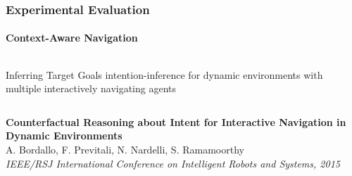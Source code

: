 \begin{frame}
	\frametitle{Experimental Evaluation}
	\framesubtitle{Context-Aware Navigation}
	
	\large
	
	\begin{columns}[t]
		{
			
			\begin{block}{Inferring Target Goals}
				intention-inference for dynamic environments with multiple interactively navigating
				agents
			\end{block}
			
		}
	\end{columns}
	
	\vspace{0.2cm}
	
	\begin{center}
	\end{center}
	
	\vspace{0.3cm}
	
	\tiny
	
	\textbf{Counterfactual Reasoning about Intent for Interactive Navigation in Dynamic Environments}\\
	A. Bordallo, F. Previtali, N. Nardelli, S. Ramamoorthy \\
	\emph{IEEE/RSJ International Conference on Intelligent Robots and Systems, 2015} \\
\end{frame}


